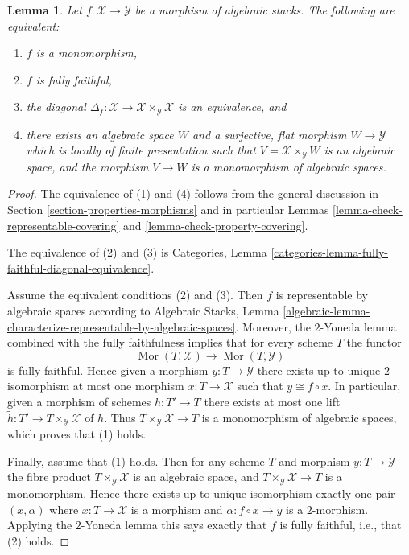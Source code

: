 \documentclass{stacks-project}
\theoremstyle{plain}
\newtheorem{lemma}[subsection]{Lemma}
\theoremstyle{definition}
\theoremstyle{remark}
\numberwithin{equation}{subsection}
\def\Mor{\mathop{\mathrm{Mor}}\nolimits}
\begin{document}
\begin{lemma}
\label{lemma-monomorphism}
Let $f : \mathcal{X} \to \mathcal{Y}$ be a morphism of algebraic stacks.
The following are equivalent:
\begin{enumerate}
\item $f$ is a monomorphism,
\item $f$ is fully faithful,
\item the diagonal
$\Delta_f : \mathcal{X} \to \mathcal{X} \times_\mathcal{Y} \mathcal{X}$
is an equivalence, and
\item there exists an algebraic space $W$ and a surjective, flat morphism
$W \to \mathcal{Y}$ which is locally of finite presentation such that
$V = \mathcal{X} \times_\mathcal{Y} W$ is an algebraic space, and the
morphism $V \to W$ is a monomorphism of algebraic spaces.
\end{enumerate}
\end{lemma}

\begin{proof}
The equivalence of (1) and (4) follows from the general discussion in
Section \ref{section-properties-morphisms}
and in particular
Lemmas \ref{lemma-check-representable-covering} and
\ref{lemma-check-property-covering}.

\medskip\noindent
The equivalence of (2) and (3) is
Categories, Lemma \ref{categories-lemma-fully-faithful-diagonal-equivalence}.

\medskip\noindent
Assume the equivalent conditions (2) and (3). Then $f$ is representable
by algebraic spaces according to
Algebraic Stacks,
Lemma \ref{algebraic-lemma-characterize-representable-by-algebraic-spaces}.
Moreover, the $2$-Yoneda lemma combined with the fully faithfulness
implies that for every scheme $T$ the functor
$$
\Mor(T, \mathcal{X})
\longrightarrow
\Mor(T, \mathcal{Y})
$$
is fully faithful. Hence given a morphism $y : T \to \mathcal{Y}$ there exists
up to unique $2$-isomorphism at most one morphism $x : T \to \mathcal{X}$
such that $y \cong f \circ x$. In particular, given a morphism of schemes
$h : T' \to T$ there exists at most one lift
$\tilde h : T' \to T \times_\mathcal{Y} \mathcal{X}$ of $h$.
Thus $T \times_\mathcal{Y} \mathcal{X} \to T$ is a monomorphism of
algebraic spaces, which proves that (1) holds.

\medskip\noindent
Finally, assume that (1) holds. Then for any scheme $T$ and morphism
$y : T \to \mathcal{Y}$ the fibre product $T \times_\mathcal{Y} \mathcal{X}$
is an algebraic space, and $T \times_\mathcal{Y} \mathcal{X} \to T$
is a monomorphism. Hence there exists up to unique isomorphism
exactly one pair $(x, \alpha)$ where $x : T \to \mathcal{X}$ is a morphism
and $\alpha : f \circ x \to y$ is a $2$-morphism. Applying
the $2$-Yoneda lemma this says exactly that $f$ is fully faithful, i.e.,
that (2) holds.
\end{proof}
\end{document}
